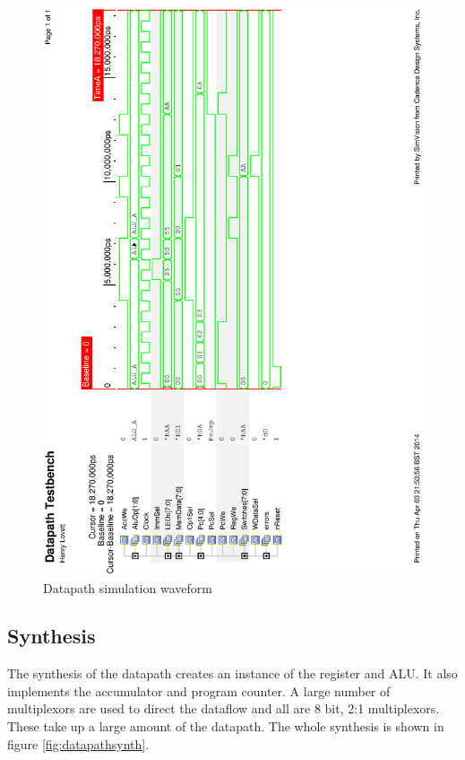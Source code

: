 \begin{figure}
\includegraphics[height=\textheight]{Figures/datapathsim.eps}
\caption{Datapath simulation waveform}
\label{fig:datapathsim}
\end{figure}

\subsection{Synthesis}

The synthesis of the datapath creates an instance of the register and ALU. 
It also implements the accumulator and program counter. 
A large number of multiplexors are used to direct the dataflow and all are 8 bit, 2:1 multiplexors. 
These take up a large amount of the datapath. 
The whole synthesis is shown in figure \ref{fig:datapathsynth}.


